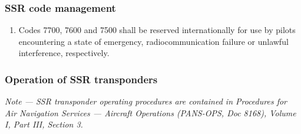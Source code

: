 \documentclass[../main.tex]{subfiles}
\begin{document}
    \subsubsection{SSR code management}

    \begin{enumerate}
        \item Codes 7700, 7600 and 7500 shall be reserved internationally for use by pilots encountering a state of emergency, radiocommunication failure or unlawful interference, respectively.

    \end{enumerate}

    \subsubsection{Operation of SSR transponders}

    \begin{enumempty}[labelindent=\parindent]
        \item \textit{Note --- SSR transponder operating procedures are contained in Procedures for Air Navigation Services — Aircraft Operations (PANS-OPS, Doc 8168), Volume I, Part III, Section 3.}
    \end{enumempty}
\end{document}
